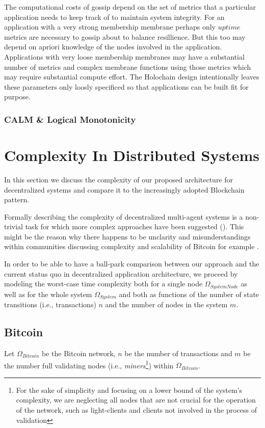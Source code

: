 \documentclass[twocolumn,showpacs,
  nofootinbib,aps,superscriptaddress,
  eqsecnum,prd,notitlepage,showkeys,10pt]{revtex4-1}
\begin{document}
The computational costs of gossip depend on the set of metrics that a particular application needs to keep track of to maintain system integrity.  For an application with a very strong membership membrane perhaps only $uptime$ metrics are necessary to gossip about to balance resillience.  But this too may depend on apriori knowledge of the nodes involved in the application.  Applications with very loose membership membranes may have a substantial number of metrics and complex membrane functions using those metrics which may require substantial compute effort.  The Holochain design intentionally leaves these parameters only loosly specificed so that applications can be built fit for purpose.

\subsubsection{CALM \& Logical Monotonicity}


\section{Complexity In Distributed Systems}
\label{sec:complexity}

In this section we discuss the complexity of our proposed architecture for decentralized systems and compare it to the increasingly adopted Blockchain pattern.

Formally describing the complexity of decentralized multi-agent systems is a non-trivial task for which more complex approaches have been suggested (\cite{multi-agent-complex}).
This might be the reason why there happens to be unclarity and misunderstandings within communities discussing complexity and scalability of Bitcoin for example {\cite{bitcoin-complex}}.

In order to be able to have a ball-park comparison between our approach and the current status quo in decentralized application architecture, we proceed by modeling the worst-case time complexity both for a single node $\Omega_{SystemNode}$ as well as for the whole system $\Omega_{System}$ and both as functions of the number of state transitions (i.e., transactions) $n$ and the number of nodes in the system $m$.

\subsection{Bitcoin}
Let $\Omega_{Bitcoin}$ be the Bitcoin network, $n$ be the number of transactions and $m$ be the number full validating nodes (i.e., \textit{miners}\footnote{For the sake of simplicity and focusing on a lower bound of the system's complexity, we are neglecting all nodes that are not crucial for the operation of the network, such as light-clients and clients not involved in the process of validation}) within $\Omega_{Bitcoin}$.
\end{document}
